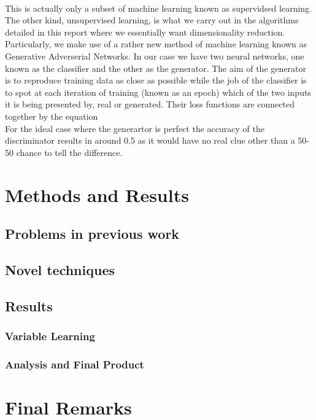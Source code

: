 \documentclass[11pt]{article} %
\begin{document}
\\
\par This is actually only a subset of machine learning known as supervidsed learning.
The other kind, unsupervised learning, is what we carry out in the algorithms detailed in this report where we essentially want dimensionality reduction.
Particularly, we make use of a rather new method of machine learning known as Generative Adverserial Networks.
In our case we have two neural networks, one known as the classifier and the other as the generator.
The aim of the generator is to reproduce training data as close as possible while the job of the classifier is to
spot at each iteration of training (known as an epoch) which of the two inputs it is being presented by, real or generated.
Their loss functions are connected together by the equation
\\
For the ideal case where the generartor is perfect the accuracy of the discriminator results in around 0.5 as it would have no real clue other than a 50-50 chance to tell the difference.


\section{Methods and Results}
\subsection{Problems in previous work}

\subsection{Novel techniques}

\subsection{Results}
\subsubsection{Variable Learning}

\subsubsection{Analysis and Final Product}


\section{Final Remarks}

\newpage
\printbibliography
\end{document}
